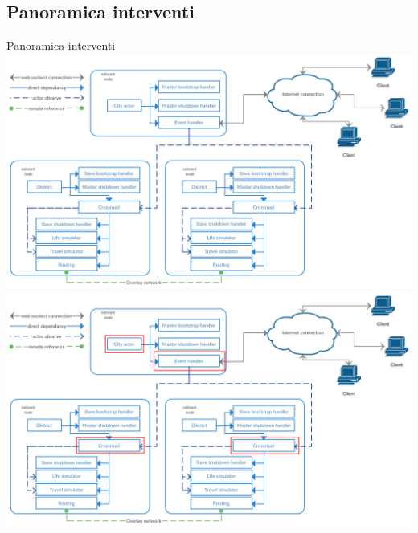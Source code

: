 \subsection{Panoramica interventi}
\begin{frame}{Panoramica interventi}
	\only<1>
	{
		\centering
		\includegraphics[scale=0.27]{images/finalDesign.png}
	}
	\only<2>
	{
		\centering
		\includegraphics[scale=0.27]{images/graphicIntervents.png}
	}
\end{frame}

